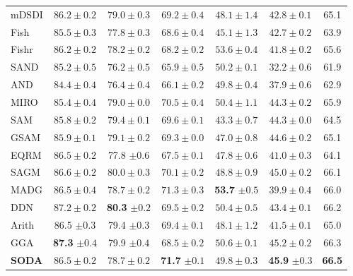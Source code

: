 \documentclass[preprint,12pt]{elsarticle}
\begin{document}
\begin{table}[t]
\begin{tabular}{lcccccc}
mDSDI \citep{bui2021exploiting} & $86.2 \pm 0.2$ & $79.0 \pm 0.3$ & $69.2 \pm 0.4$ & $48.1 \pm 1.4$ & $42.8 \pm 0.1$ & 65.1 \\
Fish \citep{shi2022gradient} & $85.5 \pm 0.3$ & $77.8 \pm 0.3$ & $68.6 \pm 0.4$ & $45.1 \pm 1.3$ & $42.7 \pm 0.2$ & 63.9 \\
Fishr \citep{rame2022fishr} & $86.2 \pm 0.2$ & $78.2 \pm 0.2$ & $68.2 \pm 0.2$ & $53.6 \pm 0.4$ & $41.8 \pm 0.2$ & 65.6 \\
SAND \citep{shahtalebi2021sandmask} & $85.2 \pm 0.5$ & $76.2 \pm 0.5$ & $65.9 \pm 0.5$ & $50.2 \pm 0.1$ & $32.2 \pm 0.6$ & 61.9 \\
AND \citep{park2021andmask} & $84.4 \pm 0.4$ & $76.4 \pm 0.4$ & $66.1 \pm 0.2$ & $49.8 \pm 0.4$ & $37.9 \pm 0.6$ & 62.9 \\
MIRO \citep{cha2022domain} & $85.4 \pm 0.4$ & $79.0 \pm 0.0$ & $70.5 \pm 0.4$ & $50.4 \pm 1.1$ & $44.3 \pm 0.2$ & 65.9 \\
SAM \citep{foret2021sharpness} & $85.8 \pm 0.2$ & $79.4 \pm 0.1$ & $69.6 \pm 0.1$ & $43.3 \pm 0.7$ & $44.3 \pm 0.0$ & 64.5 \\
GSAM \citep{zhuang2022surrogate} & $85.9 \pm 0.1$ & $79.1 \pm 0.2$ & $69.3 \pm 0.0$ & $47.0 \pm 0.8$ & $44.6 \pm 0.2$ & 65.1 \\
EQRM \citep{eastwood2022probable} & $86.5 \pm 0.2$ & 77.8 $\pm 0.6$ & $67.5 \pm 0.1$ & $47.8 \pm 0.6$ & $41.0 \pm 0.3$ & 64.1 \\
SAGM \citep{wang2023sharpness} & $86.6 \pm 0.2$ & $80.0 \pm 0.3$ & $70.1 \pm 0.2$ & $48.8 \pm 0.9$ & $45.0 \pm 0.2$ & 66.1 \\
MADG \citep{madg2023} & $86.5 \pm 0.4$ & $78.7 \pm 0.2$ & $71.3 \pm 0.3$ & \textbf{53.7} $\pm 0.5$ & $39.9 \pm 0.4$ & 66.0 \\
DDN \citep{zhang2023aggregation} & $87.2 \pm 0.2$ & \textbf{80.3} $\pm 0.2$ & $69.5 \pm 0.2$ & $50.4 \pm 0.5$ & $43.4 \pm 0.1$ & 66.2 \\
Arith \citep{Wang2025BalancedDF} & 86.5 $\pm 0.3$ & 79.4 $\pm 0.3$ & $69.4 \pm 0.1$ & $48.1 \pm 1.2$ & $41.5 \pm 0.1$ & 65.0 \\
GGA \citep{gga2025} & \textbf{87.3} $\pm 0.4$ & 79.9 $\pm 0.4$ & $68.5 \pm 0.2$ & $50.6 \pm 0.1$ & $45.2 \pm 0.2$ & 66.3 \\
\midrule
\textbf{SODA} & $86.5 \pm 0.2$ & $78.7 \pm 0.2$ & \textbf{71.7} $\pm 0.1$ & $49.8 \pm 0.3$ & \textbf{45.9} $\pm 0.3$ & \textbf{66.5} \\
\bottomrule
\end{tabular}
\endgroup \end{table}
\end{document}
